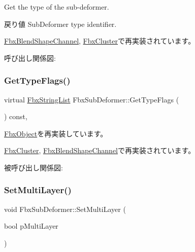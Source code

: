 Get the type of the sub-\/deformer. \begin{DoxyReturn}{戻り値}
Sub\+Deformer type identifier. 
\end{DoxyReturn}


\hyperlink{class_fbx_blend_shape_channel_a1dba13e481ea7ba1874587ad92ee0347}{Fbx\+Blend\+Shape\+Channel}, \hyperlink{class_fbx_cluster_aa395931c54c7a8b7e23b1be50b32a1d6}{Fbx\+Cluster}で再実装されています。

呼び出し関係図\+:
\mbox{\label{class_fbx_sub_deformer_a80652fd0521b2ea1897e221e5ae1b5cf}} 
\subsubsection{\texorpdfstring{Get\+Type\+Flags()}{GetTypeFlags()}}
{\footnotesize\ttfamily virtual \hyperlink{class_fbx_string_list}{Fbx\+String\+List} Fbx\+Sub\+Deformer\+::\+Get\+Type\+Flags (\begin{DoxyParamCaption}{ }\end{DoxyParamCaption}) const\hspace{0.3cm}{\ttfamily [protected]}, {\ttfamily [virtual]}}



\hyperlink{class_fbx_object_a6d30a5d00400039a248977cf9f9255b2}{Fbx\+Object}を再実装しています。



\hyperlink{class_fbx_cluster_af989ca14bdf9e025f3db49183dc09811}{Fbx\+Cluster}, \hyperlink{class_fbx_blend_shape_channel_a354002154ea342025ba0936e656b640a}{Fbx\+Blend\+Shape\+Channel}で再実装されています。

被呼び出し関係図\+:
\mbox{\label{class_fbx_sub_deformer_a46748fbb4e8496449bb28e6eeefde288}} 
\subsubsection{\texorpdfstring{Set\+Multi\+Layer()}{SetMultiLayer()}}
{\footnotesize\ttfamily void Fbx\+Sub\+Deformer\+::\+Set\+Multi\+Layer (\begin{DoxyParamCaption}\item[{bool}]{p\+Multi\+Layer }\end{DoxyParamCaption})}

